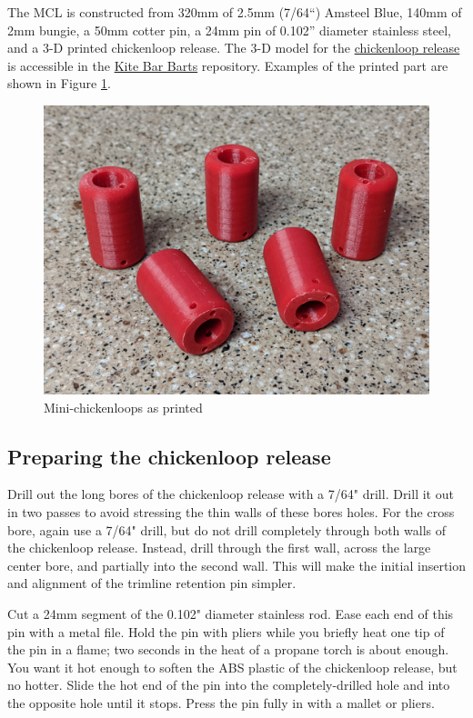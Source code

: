 \documentclass[
]{book}
\begin{document}
The MCL is constructed from 320mm of 2.5mm (7/64``) Amsteel Blue, 140mm of 2mm bungie, a 50mm cotter pin, a 24mm pin of 0.102'' diameter stainless steel, and a 3-D printed chickenloop release. The 3-D model for the \href{https://github.com/pbchase/kite_bar_parts/blob/master/printable/chickenloop_release_d1928a2.stl}{chickenloop release} is accessible in the \href{https://github.com/pbchase/kite_bar_parts}{Kite Bar Barts} repository. Examples of the printed part are shown in Figure \ref{fig:chickenloop-release}.

\begin{figure}

{\centering \includegraphics[width=0.7\linewidth]{images/chickenloop_release} 

}

\caption{Mini-chickenloops as printed}\label{fig:chickenloop-release}
\end{figure}

\hypertarget{preparing-the-chickenloop-release}{%
\subsection{Preparing the chickenloop release}\label{preparing-the-chickenloop-release}}

Drill out the long bores of the chickenloop release with a 7/64" drill. Drill it out in two passes to avoid stressing the thin walls of these bores holes. For the cross bore, again use a 7/64" drill, but do not drill completely through both walls of the chickenloop release. Instead, drill through the first wall, across the large center bore, and partially into the second wall. This will make the initial insertion and alignment of the trimline retention pin simpler.

Cut a 24mm segment of the 0.102" diameter stainless rod. Ease each end of this pin with a metal file. Hold the pin with pliers while you briefly heat one tip of the pin in a flame; two seconds in the heat of a propane torch is about enough. You want it hot enough to soften the ABS plastic of the chickenloop release, but no hotter. Slide the hot end of the pin into the completely-drilled hole and into the opposite hole until it stops. Press the pin fully in with a mallet or pliers.
\end{document}
